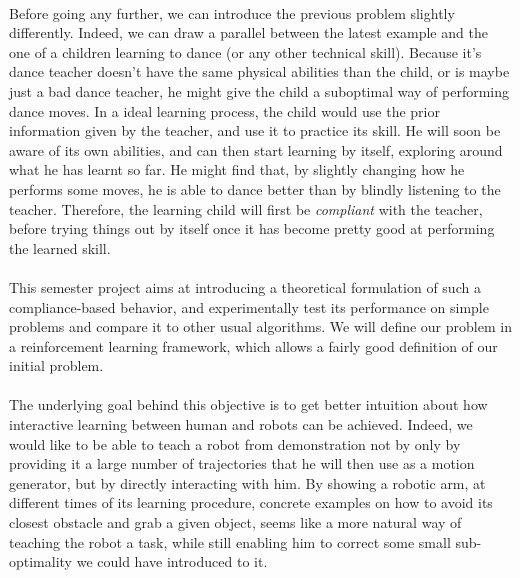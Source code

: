 \documentclass[a4paper]{report}
\begin{document}
{{			\paragraph{} Before going any further, we can introduce the previous problem slightly differently.  Indeed, we can draw a parallel between the latest example and the one of a children learning to dance (or any other technical skill). Because it's dance teacher doesn't have the same physical abilities than the child, or is maybe just a bad dance teacher, he might give the child a suboptimal way of performing dance moves. In a ideal learning process, the child would use the prior information given by the teacher, and use it to practice its skill. He will soon be aware of its own abilities, and can then start learning by itself, exploring around what he has learnt so far. He might find that, by slightly changing how he performs some moves,  he is able to dance better than by blindly listening to the teacher. Therefore, the learning child will first be \emph{compliant} with the teacher, before trying things out by itself once it has become pretty good at performing the learned skill. 
			
			\paragraph{} This semester project aims at introducing a theoretical formulation of such a compliance-based behavior, and experimentally test its performance on simple problems and compare it to other usual algorithms. We will define our problem in a reinforcement learning framework, which allows a fairly good definition of our initial problem. 
			
			\paragraph{} The underlying goal behind this objective is to get better intuition about how interactive learning between human and robots can be achieved. Indeed, we would like to be able to teach a robot from demonstration not by only by providing it a large number of trajectories that he will then use as a motion generator, but by directly interacting with him. By showing a robotic arm, at different times of its learning procedure, concrete examples on how to avoid its closest obstacle and grab a given object, seems like a more natural way of teaching the robot a task, while still enabling him to correct some small sub-optimality we could have introduced to it. 
			
}}
\end{document}
